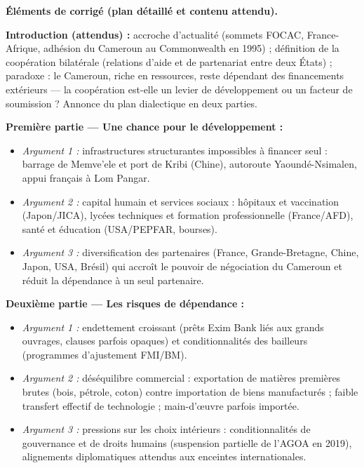 \documentclass[11pt]{article}
\begin{document}
\begin{corrige}
\textbf{Éléments de corrigé (plan détaillé et contenu attendu).}

\textbf{Introduction (attendus) :} accroche d'actualité (sommets FOCAC, France-Afrique, adhésion du Cameroun au Commonwealth en 1995) ; définition de la coopération bilatérale (relations d'aide et de partenariat entre deux États) ; paradoxe : le Cameroun, riche en ressources, reste dépendant des financements extérieurs — la coopération est-elle un levier de développement ou un facteur de soumission ? Annonce du plan dialectique en deux parties.

\textbf{Première partie — Une chance pour le développement :}
\begin{itemize}
\item \emph{Argument 1 :} infrastructures structurantes impossibles à financer seul : barrage de Memve'ele et port de Kribi (Chine), autoroute Yaoundé-Nsimalen, appui français à Lom Pangar.
\item \emph{Argument 2 :} capital humain et services sociaux : hôpitaux et vaccination (Japon/JICA), lycées techniques et formation professionnelle (France/AFD), santé et éducation (USA/PEPFAR, bourses).
\item \emph{Argument 3 :} diversification des partenaires (France, Grande-Bretagne, Chine, Japon, USA, Brésil) qui accroît le pouvoir de négociation du Cameroun et réduit la dépendance à un seul partenaire.
\end{itemize}

\textbf{Deuxième partie — Les risques de dépendance :}
\begin{itemize}
\item \emph{Argument 1 :} endettement croissant (prêts Exim Bank liés aux grands ouvrages, clauses parfois opaques) et conditionnalités des bailleurs (programmes d'ajustement FMI/BM).
\item \emph{Argument 2 :} déséquilibre commercial : exportation de matières premières brutes (bois, pétrole, coton) contre importation de biens manufacturés ; faible transfert effectif de technologie ; main-d'œuvre parfois importée.
\item \emph{Argument 3 :} pressions sur les choix intérieurs : conditionnalités de gouvernance et de droits humains (suspension partielle de l'AGOA en 2019), alignements diplomatiques attendus aux enceintes internationales.
\end{itemize}


\end{corrige}
\end{document}
